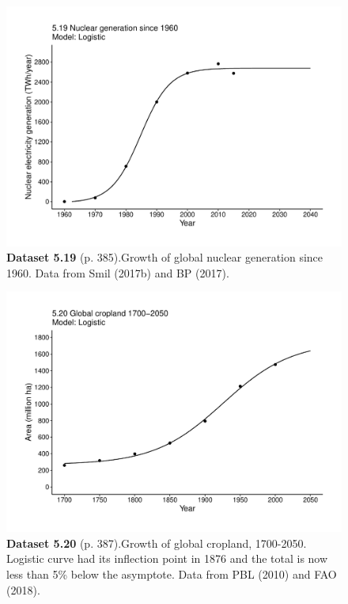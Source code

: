 \documentclass[aps,rmp,preprint,superscriptaddress,10pt,onecolumn]{article}
\begin{document}
\clearpage
\begin{figure}[h]
\includegraphics[width=\textwidth]{output/figs-ggplot/5.19.pdf}
\caption*{\textbf{Dataset 5.19} (p. 385).Growth of global nuclear generation since 1960. Data from Smil (2017b) and BP (2017).}
\end{figure}
	
\clearpage
\begin{figure}[h]
\includegraphics[width=\textwidth]{output/figs-ggplot/5.20.pdf}
\caption*{\textbf{Dataset 5.20} (p. 387).Growth of global cropland, 1700-2050. Logistic curve had its inflection point in 1876 and the total is now less than 5\% below the asymptote. Data from PBL (2010) and FAO (2018).}
\end{figure}
	
\end{document}
